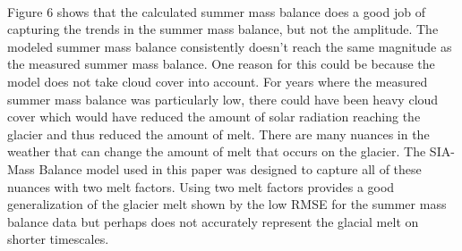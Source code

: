 \documentclass{article}
\begin{document}
\paragraph{}
Figure 6 shows that the calculated summer mass balance does a good job of capturing the trends in the summer mass balance, but not 
the amplitude. The modeled summer mass balance consistently doesn't reach the same magnitude as the measured summer mass balance. One reason for this 
could be because the model does not take cloud cover into account. For years where the measured summer mass balance was particularly low, there could 
have been heavy cloud cover which would have reduced the amount of solar radiation reaching the glacier and thus reduced the amount of melt. 
There are many nuances in the weather that can change the amount of melt that occurs on the glacier. The SIA-Mass Balance model used in this paper was designed to capture all of 
these nuances with two melt factors. Using two melt factors provides a good generalization of the glacier melt shown by the low RMSE for the summer mass balance data 
but perhaps does not accurately represent the glacial melt on shorter timescales.
\end{document}
